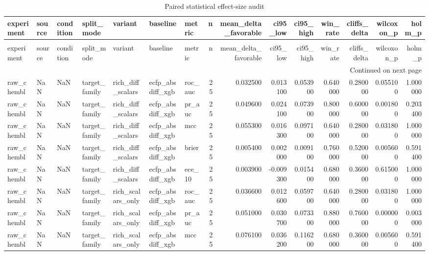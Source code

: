 \begin{longtable}{lllllllrrrrrrrr}
\caption{Paired statistical effect-size audit} \label{tab:table_11_statistical_effects} \\
\toprule
experiment & source & condition & split\_mode & variant & baseline & metric & n & mean\_delta\_favorable & ci95\_low & ci95\_high & win\_rate & cliffs\_delta & wilcoxon\_p & holm\_p \\
\midrule
\endfirsthead
\caption[]{Paired statistical effect-size audit} \\
\toprule
experiment & source & condition & split\_mode & variant & baseline & metric & n & mean\_delta\_favorable & ci95\_low & ci95\_high & win\_rate & cliffs\_delta & wilcoxon\_p & holm\_p \\
\midrule
\endhead
\midrule
\multicolumn{15}{r}{Continued on next page} \\
\midrule
\endfoot
\bottomrule
\endlastfoot
raw\_chembl & NaN & NaN & target\_family & rich\_diff\_scalars & ecfp\_absdiff\_xgb & roc\_auc & 25 & 0.032500 & 0.013100 & 0.053900 & 0.640000 & 0.280000 & 0.055100 & 1.000000 \\
raw\_chembl & NaN & NaN & target\_family & rich\_diff\_scalars & ecfp\_absdiff\_xgb & pr\_auc & 25 & 0.049600 & 0.024100 & 0.073900 & 0.800000 & 0.600000 & 0.001800 & 0.203400 \\
raw\_chembl & NaN & NaN & target\_family & rich\_diff\_scalars & ecfp\_absdiff\_xgb & mcc & 25 & 0.055300 & 0.016300 & 0.097100 & 0.640000 & 0.280000 & 0.031800 & 1.000000 \\
raw\_chembl & NaN & NaN & target\_family & rich\_diff\_scalars & ecfp\_absdiff\_xgb & brier & 25 & 0.005400 & 0.002000 & 0.009100 & 0.760000 & 0.520000 & 0.005600 & 0.591400 \\
raw\_chembl & NaN & NaN & target\_family & rich\_diff\_scalars & ecfp\_absdiff\_xgb & ece\_10 & 25 & 0.003900 & -0.009300 & 0.015400 & 0.680000 & 0.360000 & 0.615000 & 1.000000 \\
raw\_chembl & NaN & NaN & target\_family & rich\_scalars\_only & ecfp\_absdiff\_xgb & roc\_auc & 25 & 0.036600 & 0.012600 & 0.059700 & 0.640000 & 0.280000 & 0.031800 & 1.000000 \\
raw\_chembl & NaN & NaN & target\_family & rich\_scalars\_only & ecfp\_absdiff\_xgb & pr\_auc & 25 & 0.051000 & 0.030700 & 0.073300 & 0.880000 & 0.760000 & 0.000000 & 0.003000 \\
raw\_chembl & NaN & NaN & target\_family & rich\_scalars\_only & ecfp\_absdiff\_xgb & mcc & 25 & 0.076100 & 0.036200 & 0.116200 & 0.680000 & 0.360000 & 0.005600 & 0.591400 \\

\end{longtable}
